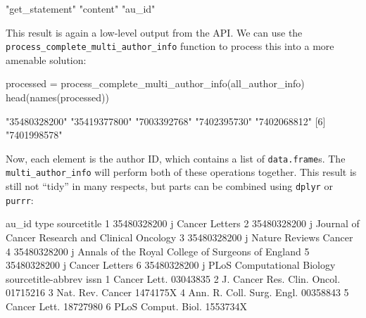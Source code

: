 \begin{Schunk}
\begin{Soutput}
[1] "get_statement" "content"       "au_id"        
\end{Soutput}
\end{Schunk}

This result is again a low-level output from the API. We can use the
\texttt{process\_complete\_multi\_author\_info} function to process this
into a more amenable solution:

\begin{Schunk}
\begin{Sinput}
processed = process_complete_multi_author_info(all_author_info)
head(names(processed))
\end{Sinput}
\begin{Soutput}
[1] "35480328200" "35419377800" "7003392768"  "7402395730"  "7402068812" 
[6] "7401998578" 
\end{Soutput}
\end{Schunk}

Now, each element is the author ID, which contains a list of
\texttt{data.frame}s. The \texttt{multi\_author\_info} will perform both
of these operations together. This result is still not ``tidy'' in many
respects, but parts can be combined using \texttt{dplyr} or
\texttt{purrr}:

\begin{Schunk}
\begin{Soutput}
        au_id type                                        sourcetitle
1 35480328200    j                                     Cancer Letters
2 35480328200    j   Journal of Cancer Research and Clinical Oncology
3 35480328200    j                              Nature Reviews Cancer
4 35480328200    j Annals of the Royal College of Surgeons of England
5 35480328200    j                                     Cancer Letters
6 35480328200    j                         PLoS Computational Biology
           sourcetitle-abbrev     issn
1                Cancer Lett. 03043835
2 J. Cancer Res. Clin. Oncol. 01715216
3            Nat. Rev. Cancer 1474175X
4   Ann. R. Coll. Surg. Engl. 00358843
5                Cancer Lett. 18727980
6          PLoS Comput. Biol. 1553734X
\end{Soutput}
\end{Schunk}

